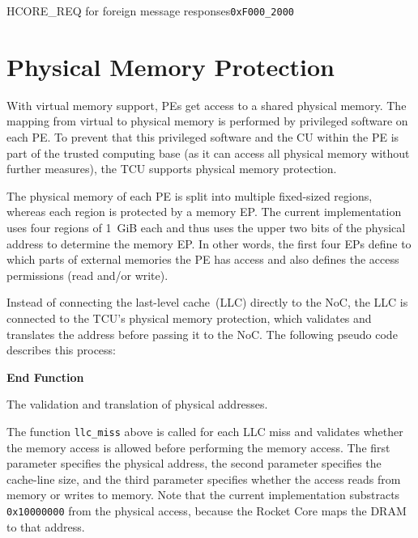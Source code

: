\begin{register}{H}{CORE\_REQ for foreign message responses}{\texttt{0xF000\_2000}}
  \regnewline%
\end{register}
\extend{}

\section{Physical Memory Protection}

\noindent With virtual memory support, PEs get access to a shared physical memory. The mapping from
virtual to physical memory is performed by privileged software on each PE. To prevent that this
privileged software and the CU within the PE is part of the trusted computing base (as it can access
all physical memory without further measures), the TCU supports physical memory protection.

The physical memory of each PE is split into multiple fixed-sized regions, whereas each region is
protected by a memory EP. The current implementation uses four regions of 1~GiB each and thus uses
the upper two bits of the physical address to determine the memory EP. In other words, the first
four EPs define to which parts of external memories the PE has access and also defines the access
permissions (read and/or write).

Instead of connecting the last-level cache~(LLC) directly to the NoC, the LLC is connected to the
TCU's physical memory protection, which validates and translates the address before passing it to
the NoC. The following pseudo code describes this process:\\[.2em]

\begin{algorithm}[H]
    \textbf{End Function}
    \caption{The validation and translation of physical addresses.}
    \label{code:pmp}
\end{algorithm}

\noindent The function \texttt{llc\_miss} above is called for each LLC miss and validates whether
the memory access is allowed before performing the memory access. The first parameter specifies the
physical address, the second parameter specifies the cache-line size, and the third parameter
specifies whether the access reads from memory or writes to memory. Note that the current
implementation substracts \texttt{0x10000000} from the physical access, because the Rocket Core maps
the DRAM to that address.
\extend{}
